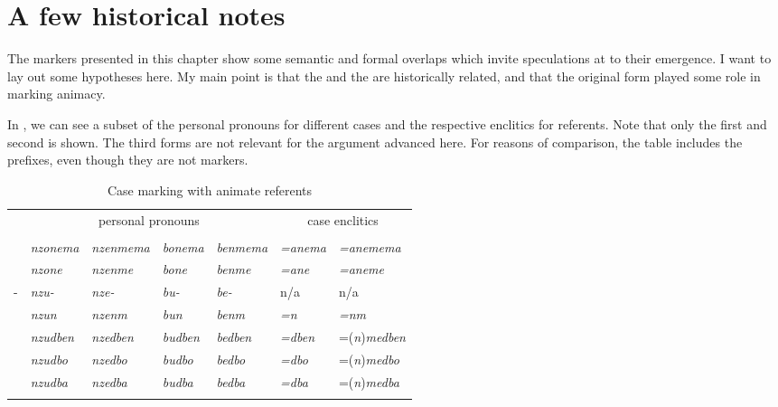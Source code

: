 \section{A few historical notes}\label{casenotes}

The  markers presented in this chapter show some semantic and formal overlaps which invite speculations at to their emergence. I want to lay out some hypotheses here. My main point is that the  and the  are historically related, and that the original form played some role in marking animacy.%

In , we can see a subset of the personal pronouns for different cases and the respective  enclitics for  referents. Note that only the first and second  is shown. The third  forms are not relevant for the argument advanced here. For reasons of comparison, the table includes the  prefixes, even though they are not  markers.

\begin{table}
\begin{center}
\caption{Case marking with animate referents} 
\label{casediscussionss} 
	\begin{tabularx}{\textwidth}{Xllllll}	
		\lsptoprule
		&\multicolumn{4}{c}{{personal pronouns}}&\multicolumn{2}{c}{{case enclitics}}\\
		&\Fsg{}&\Fnsg{}&\Ssg{}&\Snsg{}&\Sg{}&\Nsg{}\\ \midrule
		\Char{}&\emph{nzonema}&\emph{nzenmema}&\emph{bonema}&\emph{benmema}&\emph{=anema}&\emph{=anemema}\\
		\Poss{}&\emph{nzone}&\emph{nzenme}&\emph{bone}&\emph{benme}&\emph{=ane}&\emph{=aneme}\\ 
		\Poss-&\emph{nzu-}&\emph{nze-}&\emph{bu-}&\emph{be-}&n/a&n/a\\ 
		\Dat{}&\emph{nzun}&\emph{nzenm}&\emph{bun}&\emph{benm}&\emph{=n}&\emph{=nm}\\ 
		\Loc{}&\emph{nzudben}&\emph{nzedben}&\emph{budben}&\emph{bedben}&\emph{=dben}&=(\emph{n})\emph{medben}\\ 
		\All{}&\emph{nzudbo}&\emph{nzedbo}&\emph{budbo}&\emph{bedbo}&\emph{=dbo}&=(\emph{n})\emph{medbo}\\ 
		\Abl{}&\emph{nzudba}&\emph{nzedba}&\emph{budba}&\emph{bedba}&\emph{=dba}&=(\emph{n})\emph{medba}\\ 
		\lspbottomrule
	\end{tabularx}
\end{center}
\end{table}%

